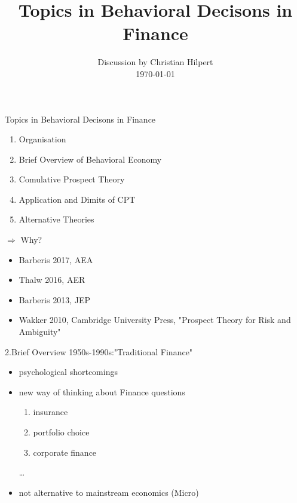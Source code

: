\documentclass[11pt,aspectratio=169]{beamer}
\begin{document}

\title{Topics in Behavioral Decisons in Finance}
\date{Discussion by Christian Hilpert\\ \today}
\begin{frame}
    \titlepage
\end{frame}


\begin{frame}{Topics in Behavioral Decisons in Finance}
    \begin{enumerate}
        \item Organisation \\
        \item Brief Overview of Behavioral Economy\\
        \item Comulative Prospect Theory\\
        \item Application and Dimits of CPT \\
        \item Alternative Theories\\
    \end{enumerate}
    $\Rightarrow$ Why?
\end{frame}

\begin{frame}
    \begin{itemize}
        \item Barberis 2017, AEA  \medskip
        \item Thalw 2016, AER \medskip
        \item Barberis 2013, JEP
        \item Wakker 2010, Cambridge University Press, "Prospect Theory for Risk and Ambiguity"
	\end{itemize}
\end{frame}

\begin{frame}{2.Brief Overview}
    1950s-1990s:"Traditional Finance" 
\begin{itemize}
	\item psychological shortcomings \medskip
    \item new way of thinking about Finance questions\medskip
        \begin{enumerate}
            \item  insurance
            \item portfolio choice
            \item corporate finance 
        \end{enumerate}
        \ldots
    \item not alternative to mainstream economics (Micro) \medskip
\end{itemize}
\end{frame}
\end{document}
